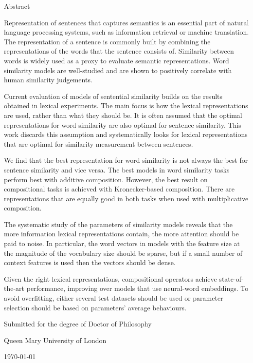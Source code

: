 {\Large \headingfont \thetitle}

\vspace{1em}

{\large \headingfont \theauthor}

\vspace{1em}

{\headingfont Abstract}

Representation of sentences that captures semantics is an essential part of natural language processing systems, such as information retrieval or machine translation. The representation of a sentence is commonly built by combining the representations of the words that the sentence consists of. Similarity between words is widely used as a proxy to evaluate semantic representations. Word similarity models are well-studied and are shown to positively correlate with human similarity judgements.

Current evaluation of models of sentential similarity builds on the results obtained in lexical experiments. The main focus is how the lexical representations are used, rather than what they should be. It is often assumed that the optimal representations for word similarity are also optimal for sentence similarity. This work discards this assumption and systematically looks for lexical representations that are optimal for similarity measurement between sentences.

We find that the best representation for word similarity is not always the best for sentence similarity and vice versa. The best models in word similarity tasks perform best with additive composition. However, the best result on compositional tasks is achieved with Kronecker-based composition. There are representations that are equally good in both tasks when used with multiplicative composition.

The systematic study of the parameters of similarity models reveals that the more information lexical representations contain, the more attention should be paid to noise. In particular, the word vectors in models with the feature size at the magnitude of the vocabulary size should be sparse, but if a small number of context features is used then the vectors should be dense.

Given the right lexical representations, compositional operators achieve state-of-the-art performance, improving over models that use neural-word embeddings. To avoid overfitting, either several test datasets should be used or parameter selection should be based on parameters' average behaviours.

\vfill


Submitted for the degree of Doctor of Philosophy

Queen Mary University of London

\today


